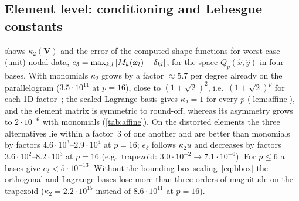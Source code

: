 \subsection{Element level: conditioning and Lebesgue constants}\label{sec:num-elements}
 shows $\kappa_2(\bm V)$ and the error of the computed shape functions for
worst-case (unit) nodal data, $e_\delta=\max_{k,l}|M_k(\bm{x}_l)-\delta_{kl}|$, for the space
$Q_p(\hat x,\hat y)$ in four bases. With monomials $\kappa_2$ grows by a factor $\approx5.7$
per degree already on the parallelogram ($3.5\cdot10^{11}$ at $p=16$), close to
$(1+\sqrt2)^2$, i.e.\ $(1+\sqrt2)^p$ for each 1D factor~\cite{Gautschi1988Lower}; the scaled
Lagrange basis gives $\kappa_2=1$ for every $p$ (\cref{lem:affine}), and the element matrix is
symmetric to round-off, whereas its asymmetry grows to $2\cdot10^{-6}$ with monomials
(\cref{tab:affine}). On the distorted elements the three alternatives lie within a factor~3 of
one another and are better than monomials by factors $4.6\cdot10^3$--$2.9\cdot10^4$ at $p=16$; $e_\delta$
follows $\kappa_2u$ and decreases by factors $3.6\cdot10^2$--$8.2\cdot10^3$ at $p=16$ (e.g.\
trapezoid: $3.0\cdot10^{-2}\to7.1\cdot10^{-6}$). For $p\le6$ all bases give $e_\delta<5\cdot10^{-13}$.
Without the bounding-box scaling~\eqref{eq:bbox} the orthogonal and Lagrange bases lose more than three
orders of magnitude on the trapezoid ($\kappa_2=2.2\cdot10^{15}$ instead of $8.6\cdot10^{11}$ at
$p=16$).

